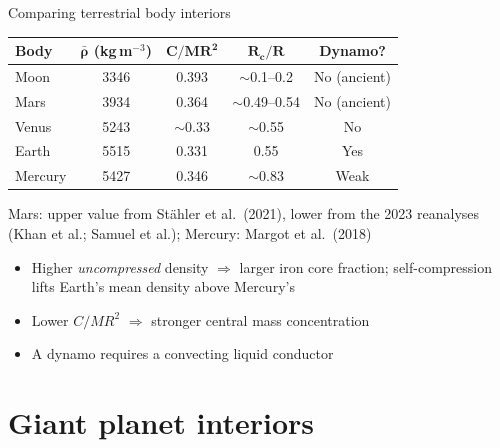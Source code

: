 \documentclass[aspectratio=169, 11pt]{beamer}
\begin{document}
\begin{frame}{Comparing terrestrial body interiors}
  \centering
  \small
  \begin{tabular}{l c c c c}
    \toprule
    \textbf{Body} & $\boldsymbol{\bar{\rho}}$ \textbf{(kg\,m$^{-3}$)} & $\boldsymbol{C/MR^2}$ & $\boldsymbol{R_c/R}$ & \textbf{Dynamo?} \\
    \midrule
    Moon    & 3346 & 0.393 & $\sim$0.1--0.2 & No (ancient) \\
    Mars    & 3934 & 0.364 & $\sim$0.49--0.54 & No (ancient) \\
    Venus   & 5243 & $\sim$0.33 & $\sim$0.55 & No \\
    Earth   & 5515 & 0.331 & 0.55 & Yes \\
    Mercury & 5427 & 0.346 & $\sim$0.83 & Weak \\
    \bottomrule
  \end{tabular}
  \vskip4pt
  {\tiny\color{ipsText!60} Mars: upper value from Stähler et al.\ (2021), lower from the 2023 reanalyses (Khan et al.; Samuel et al.); Mercury: Margot et al.\ (2018)}
  \vskip6pt
  \raggedright
  \begin{itemize}\setlength\itemsep{3pt}
    \item Higher \emph{uncompressed} density $\Rightarrow$ larger iron core fraction; self-compression lifts Earth's mean density above Mercury's
    \item Lower $C/MR^2$ $\Rightarrow$ stronger central mass concentration
    \item A dynamo requires a convecting liquid conductor
  \end{itemize}
\end{frame}

\begin{frame}
\end{frame}


\section{Giant planet interiors}
\end{document}
